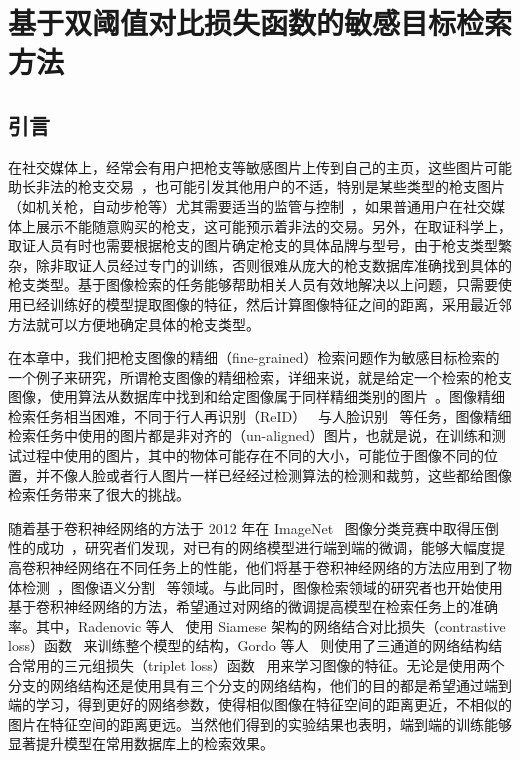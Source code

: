 
\chapter{基于双阈值对比损失函数的敏感目标检索方法}\label{chapter:double_margin}

\section{引言}
在社交媒体上，经常会有用户把枪支等敏感图片上传到自己的主页，这些图片可能助长非法的枪支交易~\cite{Drange2016,MELE2016FacebookBG}，也可能引发其他用户的不适，特别是某些类型的枪支图片（如机关枪，自动步枪等）尤其需要适当的监管与控制~\cite{Hsu2018Bumble}，如果普通用户在社交媒体上展示不能随意购买的枪支，这可能预示着非法的交易。另外，在取证科学上，取证人员有时也需要根据枪支的图片确定枪支的具体品牌与型号，由于枪支类型繁杂，除非取证人员经过专门的训练，否则很难从庞大的枪支数据库准确找到具体的枪支类型。基于图像检索的任务能够帮助相关人员有效地解决以上问题，只需要使用已经训练好的模型提取图像的特征，然后计算图像特征之间的距离，采用最近邻方法就可以方便地确定具体的枪支类型。

在本章中，我们把枪支图像的精细（fine-grained）检索问题作为敏感目标检索的一个例子来研究，所谓枪支图像的精细检索，详细来说，就是给定一个检索的枪支图像，使用算法从数据库中找到和给定图像属于同样精细类别的图片~\cite{Song2016DeepML,Wang2017DeepML}。图像精细检索任务相当困难，不同于行人再识别（ReID）~\cite{Zhao2013UnsupervisedSL,Li2014DeepReIDDF} 与人脸识别~\cite{Wen2016ADF,Taigman2014DeepFaceCT} 等任务，图像精细检索任务中使用的图片都是非对齐的（un-aligned）图片，也就是说，在训练和测试过程中使用的图片，其中的物体可能存在不同的大小，可能位于图像不同的位置，并不像人脸或者行人图片一样已经经过检测算法的检测和裁剪，这些都给图像检索任务带来了很大的挑战。

随着基于卷积神经网络的方法于 2012 年在 ImageNet~\cite{Russakovsky2015ImageNetLS} 图像分类竞赛中取得压倒性的成功~\cite{Krizhevsky2012ImageNetCW}，研究者们发现，对已有的网络模型进行端到端的微调，能够大幅度提高卷积神经网络在不同任务上的性能，他们将基于卷积神经网络的方法应用到了物体检测~\cite{Liu2016SSDSS,Redmon2016YouOL,Lin2017FocalLF,Ren2017FasterRT}，图像语义分割~\cite{Shelhamer2017FullyCN,Chen2018DeepLabSI,Noh2015LearningDN} 等领域。与此同时，图像检索领域的研究者也开始使用基于卷积神经网络的方法，希望通过对网络的微调提高模型在检索任务上的准确率。其中，Radenovic 等人~\cite{Radenovic2016CNNIR} 使用 Siamese 架构的网络结合对比损失（contrastive loss）函数~\cite{Chopra2005LearningAS,Hadsell2006DimensionalityRB,Han2015MatchNetUF} 来训练整个模型的结构，Gordo 等人~\cite{Gordo2016DeepIR} 则使用了三通道的网络结构结合常用的三元组损失（triplet loss）函数~\cite{Schroff2015FaceNetAU,Wang2014LearningFI,G2016LearningLI,Weinberger2006DistanceML} 用来学习图像的特征。无论是使用两个分支的网络结构还是使用具有三个分支的网络结构，他们的目的都是希望通过端到端的学习，得到更好的网络参数，使得相似图像在特征空间的距离更近，不相似的图片在特征空间的距离更远。当然他们得到的实验结果也表明，端到端的训练能够显著提升模型在常用数据库上的检索效果。

